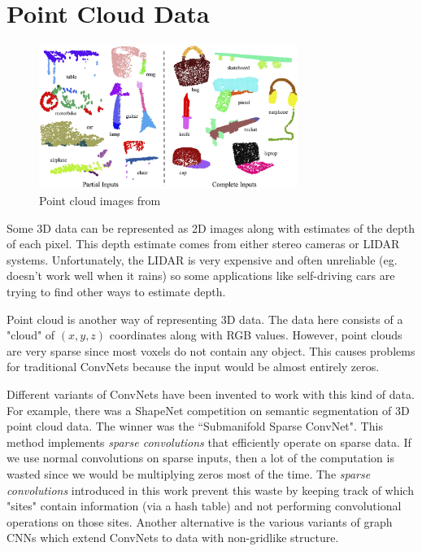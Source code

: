 \section{Point Cloud Data}
\begin{figure}[h]
    \centering
    \includegraphics[width=0.75\textwidth]{lectures/05-a/pointnet.jpg}
    \caption{Point cloud images from \citep{qi2017pointnet}}
    \label{fig:unet}
\end{figure}

Some 3D data can be represented as 2D images along with estimates of the depth of each pixel. This depth estimate comes from either stereo cameras or LIDAR systems. Unfortunately, the LIDAR is very expensive and often unreliable (eg. doesn't work well when it rains) so some applications like self-driving cars are trying to find other ways to estimate depth.

Point cloud is another way of representing 3D data. The data here consists of a "cloud" of $(x,y,z)$  coordinates along with RGB values. However, point clouds are very sparse since most voxels do not contain any object. This causes problems for traditional ConvNets because the input would be almost entirely zeros.

Different variants of ConvNets have been invented to work with this kind of data. For example, there was a ShapeNet competition on semantic segmentation of 3D point cloud data.
The winner was the ``Submanifold Sparse ConvNet". This method implements {\it sparse convolutions} that efficiently operate on sparse data. If we use normal convolutions on sparse inputs, then a lot of the computation is wasted since we would be multiplying zeros most of the time. The {\it sparse convolutions} introduced in this work prevent this waste by keeping track of which "sites" contain information (via a hash table) and not performing convolutional operations on those sites. Another alternative is the various variants of graph CNNs which extend ConvNets to data with non-gridlike structure.

